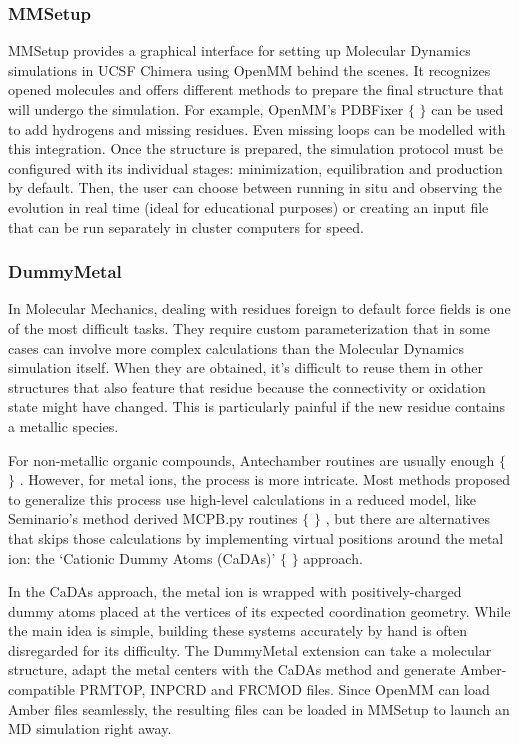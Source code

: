 \subsubsection{MMSetup}
MMSetup provides a graphical interface for setting up Molecular Dynamics simulations in UCSF Chimera using OpenMM behind the scenes. It recognizes opened molecules and offers different methods to prepare the final structure that will undergo the simulation. For example, OpenMM’s PDBFixer $ \{ $ $ \} $  can be used to add hydrogens and missing residues. Even missing loops can be modelled with this integration. Once the structure is prepared, the simulation protocol must be configured with its individual stages: minimization, equilibration and production by default. Then, the user can choose between running in situ and observing the evolution in real time (ideal for educational purposes) or creating an input file that can be run separately in cluster computers for speed.

\subsubsection{DummyMetal}
In Molecular Mechanics, dealing with residues foreign to default force fields is one of the most difficult tasks. They require custom parameterization that in some cases can involve more complex calculations than the Molecular Dynamics simulation itself. When they are obtained, it’s difficult to reuse them in other structures that also feature that residue because the connectivity or oxidation state might have changed. This is particularly painful if the new residue contains a metallic species.

For non-metallic organic compounds, Antechamber routines are usually enough $ \{ $ $ \} $ . However, for metal ions, the process is more intricate. Most methods proposed to generalize this process use high-level calculations in a reduced model, like Seminario’s method derived MCPB.py routines $ \{ $ $ \} $ , but there are alternatives that skips those calculations by implementing virtual positions around the metal ion: the ‘Cationic Dummy Atoms (CaDAs)’ $ \{ $ $ \} $  approach.

In the CaDAs approach, the metal ion is wrapped with positively-charged dummy atoms placed at the vertices of its expected coordination geometry. While the main idea is simple, building these systems accurately by hand is often disregarded for its difficulty. The DummyMetal extension can take a molecular structure, adapt the metal centers with the CaDAs method and generate Amber-compatible PRMTOP, INPCRD and FRCMOD files. Since OpenMM can load Amber files seamlessly, the resulting files can be loaded in MMSetup to launch an MD simulation right away.

